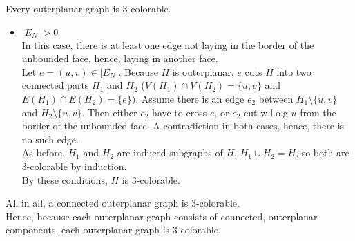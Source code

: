 \documentclass[a4paper]{article}
\begin{document}
\begin{solution}{24}
\begin{theorem}{Every outerplanar graph is 3-colorable.}
\begin{itemize}
\begin{itemize}
						\item {\emph{$|E_N| > 0$}}\\
							In this case, there is at least one edge not laying in the border of the unbounded face, hence, laying in another face.\\
							Let $e=(u,v) \in |E_N|$. Because $H$ is outerplanar, $e$ cuts $H$ into two connected parts $H_1$ and $H_2$ ($V(H_1) \cap V(H_2) = \{u,v\}$ and $E(H_1) \cap E(H_2) = \{e\})$. 
							Assume there is an edge $e_2$ between $H_1 \setminus \{u,v\}$ and $H_2 \setminus \{u,v\}$. Then either $e_2$ have to cross $e$, or $e_2$ cut w.l.o.g $u$ from the border of the unbounded face. A contradiction in both cases, hence, there is no such edge.\\
							As before, $H_1$ and $H_2$ are induced subgraphs of $H$, $H_1 \cup H_2 = H$, so both are 3-colorable by induction.\\
							By these conditions, $H$ is 3-colorable.
				\end{itemize}
		\end{itemize}				

		All in all, a connected outerplanar graph is 3-colorable.\\
		Hence, because each outerplanar graph consists of connected, outerplanar components, each outerplanar graph is 3-colorable.

		\end{theorem}
	\end{solution}
		
\end{document}

